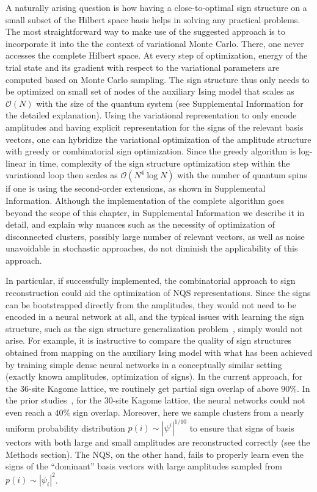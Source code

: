 A naturally arising question is how having a close-to-optimal sign structure on a small subset of the Hilbert space basis helps in solving any practical problems. The most straightforward way to make use of the suggested approach is to incorporate it into the the context of variational Monte Carlo. There, one never accesses the complete Hilbert space. At every step of optimization, energy of the trial state and its gradient with respect to the variational parameters are computed based on Monte Carlo sampling. The sign structure thus only needs to be optimized on small set of nodes of the auxiliary Ising model that scales as $\mathcal{O}(N)$ with the size of the quantum system (see Supplemental Information for the detailed explanation). Using the variational representation to only encode amplitudes and having explicit representation for the signs of the relevant basis vectors, one can hybridize the variational optimization of the amplitude structure with greedy or combinatorial sign optimization. Since the greedy algorithm is log-linear in time, complexity of the sign structure optimization step within the variational loop then scales as $\mathcal{O}(N^4\log N)$ with the number of quantum spins if one is using the second-order extensions, as shown in Supplemental Information. Although the implementation of the complete algorithm goes beyond the scope of this chapter, in Supplemental Information we describe it in detail, and explain why nuances such as the necessity of optimization of disconnected clusters, possibly large number of relevant vectors, as well as noise unavoidable in stochastic approaches, do not diminish the applicability of this approach.

In particular, if successfully implemented, the combinatorial approach to sign reconstruction could aid the optimization of NQS representations.  Since the signs can be bootstrapped directly from the amplitudes, they would not need to be encoded in a neural network at all, and the typical issues with learning the sign structure, such as the sign structure generalization problem~\cite{sign_generalization}, simply would not arise. For example, it is instructive to compare the quality of sign structures obtained from mapping on the auxiliary Ising model with what has been achieved by training simple dense neural networks in a conceptually similar setting~\cite{sign_generalization} (exactly known amplitudes, optimization of signs). In the current approach, for the 36-site Kagome lattice, we routinely get partial sign overlap of above $90\%$. In the prior studies~\cite{sign_generalization}, for the 30-site Kagome lattice, the neural networks could not even reach a $40\%$ sign overlap. Moreover, here we sample clusters from a nearly uniform probability distribution $p(i) \sim |\psi^i|^{1/10}$ to ensure that signs of basis vectors with both large and small amplitudes are reconstructed correctly (see the Methods section). The NQS, on the other hand, fails to properly learn even the signs of the ``dominant'' basis vectors with large amplitudes sampled from $p(i) \sim |\psi_i|^2$.

